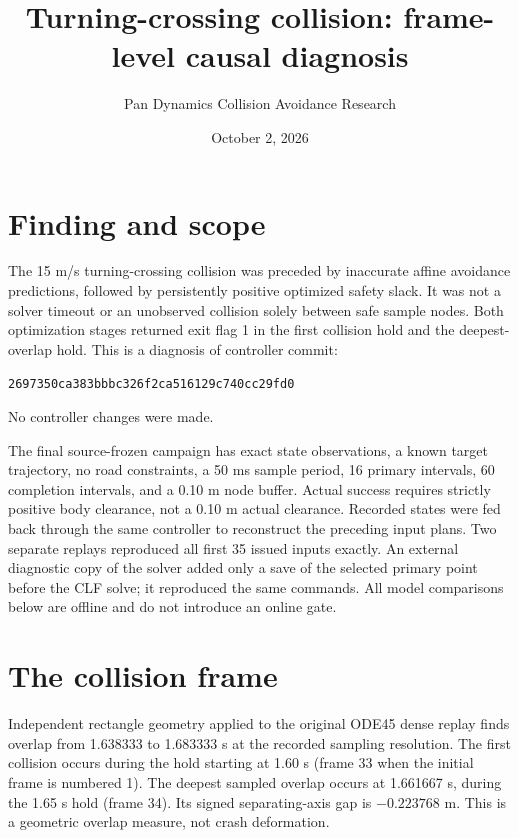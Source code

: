 \documentclass[11pt]{article}
\title{Turning-crossing collision: frame-level causal diagnosis}
\author{Pan Dynamics Collision Avoidance Research}
\date{October 2, 2026}
\begin{document}
\maketitle

\section{Finding and scope}
The 15 m/s turning-crossing collision was preceded by inaccurate affine
avoidance predictions, followed by persistently positive optimized safety
slack. It was not a solver timeout or an unobserved collision solely between
safe sample nodes. Both optimization stages returned exit flag 1 in the first
collision hold and the deepest-overlap hold. This is a diagnosis of controller
commit:
\begin{center}\small\texttt{2697350ca383bbbc326f2ca516129c740cc29fd0}\end{center}
No controller changes were made.

The final source-frozen campaign has exact state observations, a known target
trajectory, no road constraints, a 50 ms sample period, 16 primary intervals,
60 completion intervals, and a 0.10 m node buffer. Actual success requires
strictly positive body clearance, not a 0.10 m actual clearance. Recorded
states were fed back through the same controller to reconstruct the preceding
input plans. Two separate replays reproduced all first 35 issued inputs
exactly. An external diagnostic copy of the solver added only a save of the
selected primary point before the CLF solve; it reproduced the same commands.
All model comparisons below are offline and do not introduce an online gate.

\section{The collision frame}
Independent rectangle geometry applied to the original ODE45 dense replay
finds overlap from 1.638333 to 1.683333 s at the recorded sampling resolution.
The first collision occurs during the hold starting at 1.60 s (frame 33 when
the initial frame is numbered 1). The deepest sampled overlap occurs at
1.661667 s, during the 1.65 s hold (frame 34). Its signed separating-axis gap
is $-0.223768$ m. This is a geometric overlap measure, not crash deformation.
\end{document}
